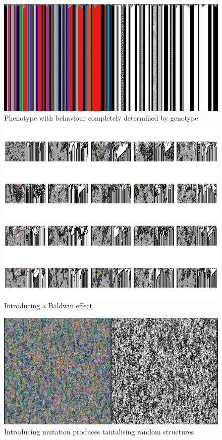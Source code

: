 \documentclass{AISB2008}
\begin{document}
\begin{figure}
\includegraphics[width=\columnwidth]{flag.png}
\caption{Phenotype with behaviour completely determined by genotype}
\end{figure}

\begin{figure}
\includegraphics[width=\columnwidth]{baldwin.png}
\caption{Introducing a Baldwin effect}
\end{figure}

\begin{figure}
\includegraphics[width=\columnwidth]{big.png}
\caption{Introducing mutation produces tantalising random structures}
\end{figure}
\end{document}
